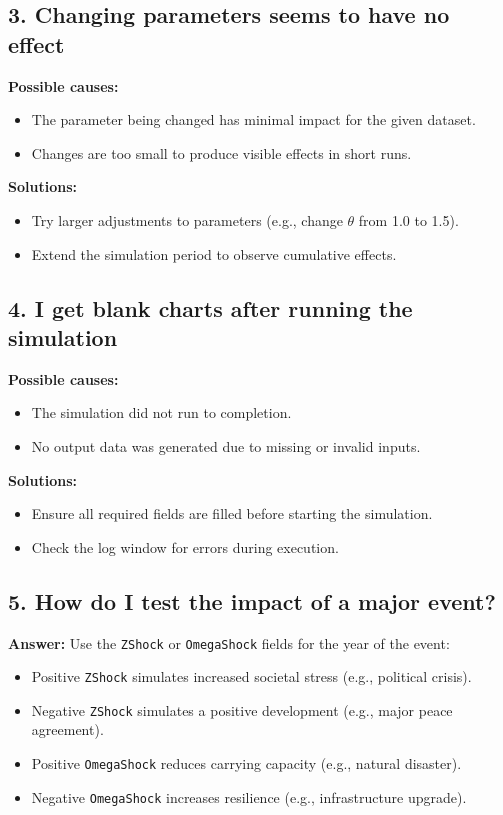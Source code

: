 \documentclass[12pt,a4paper]{article}
\begin{document}
\subsection*{3. Changing parameters seems to have no effect}
\textbf{Possible causes:}
\begin{itemize}
    \item The parameter being changed has minimal impact for the given dataset.
    \item Changes are too small to produce visible effects in short runs.
\end{itemize}
\textbf{Solutions:}
\begin{itemize}
    \item Try larger adjustments to parameters (e.g., change \(\theta\) from 1.0 to 1.5).
    \item Extend the simulation period to observe cumulative effects.
\end{itemize}

\subsection*{4. I get blank charts after running the simulation}
\textbf{Possible causes:}
\begin{itemize}
    \item The simulation did not run to completion.
    \item No output data was generated due to missing or invalid inputs.
\end{itemize}
\textbf{Solutions:}
\begin{itemize}
    \item Ensure all required fields are filled before starting the simulation.
    \item Check the log window for errors during execution.
\end{itemize}

\subsection*{5. How do I test the impact of a major event?}
\textbf{Answer:}
Use the \texttt{ZShock} or \texttt{OmegaShock} fields for the year of the event:
\begin{itemize}
    \item Positive \texttt{ZShock} simulates increased societal stress (e.g., political crisis).
    \item Negative \texttt{ZShock} simulates a positive development (e.g., major peace agreement).
    \item Positive \texttt{OmegaShock} reduces carrying capacity (e.g., natural disaster).
    \item Negative \texttt{OmegaShock} increases resilience (e.g., infrastructure upgrade).
\end{itemize}
\end{document}
